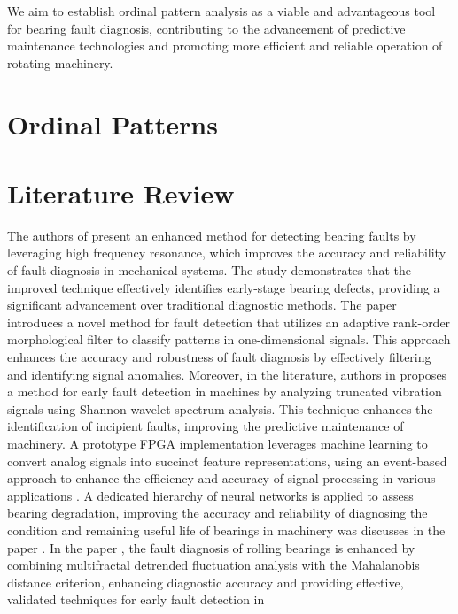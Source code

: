 \documentclass[sn-basic,pdflatex]{sn-jnl}
\theoremstyle{remark}
\theoremstyle{definition}
\begin{document}
We aim to establish ordinal pattern analysis as a viable and
advantageous tool for bearing fault diagnosis, contributing to the
advancement of predictive maintenance technologies and promoting more
efficient and reliable operation of rotating machinery.

\section{Ordinal Patterns}\label{sec2}

\section{Literature Review}\label{sec3}

The authors of \citep{WOS:000312724900101} present an enhanced method
for detecting bearing faults by leveraging high frequency resonance,
which improves the accuracy and reliability of fault diagnosis in
mechanical systems. The study demonstrates that the improved technique
effectively identifies early-stage bearing defects, providing a
significant advancement over traditional diagnostic methods. The paper
\citep{WOS:000301688000008} introduces a novel method for fault
detection that utilizes an adaptive rank-order morphological filter to
classify patterns in one-dimensional signals. This approach enhances the
accuracy and robustness of fault diagnosis by effectively filtering and
identifying signal anomalies. Moreover, in the literature, authors in
\citep{WOS:000303039300034} proposes a method for early fault detection
in machines by analyzing truncated vibration signals using Shannon
wavelet spectrum analysis. This technique enhances the identification of
incipient faults, improving the predictive maintenance of machinery. A
prototype FPGA implementation leverages machine learning to convert
analog signals into succinct feature representations, using an
event-based approach to enhance the efficiency and accuracy of signal
processing in various applications \citep{WOS:000345844100102}. A
dedicated hierarchy of neural networks is applied to assess bearing
degradation, improving the accuracy and reliability of diagnosing the
condition and remaining useful life of bearings in machinery was
discusses in the paper \citep{WOS:000396580800080}. In the paper
\citep{WOS:000320835800016}, the fault diagnosis of rolling bearings is
enhanced by combining multifractal detrended fluctuation analysis with
the Mahalanobis distance criterion, enhancing diagnostic accuracy and
providing effective, validated techniques for early fault detection in
\end{document}
